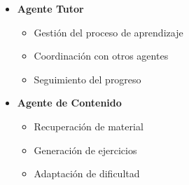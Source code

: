 \begin{itemize}
  \item \textbf{Agente Tutor}
        \begin{itemize}
          \item Gestión del proceso de aprendizaje
          \item Coordinación con otros agentes
          \item Seguimiento del progreso
        \end{itemize}

  \item \textbf{Agente de Contenido}
        \begin{itemize}
          \item Recuperación de material
          \item Generación de ejercicios
          \item Adaptación de dificultad
        \end{itemize}
\end{itemize}